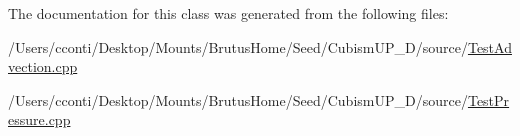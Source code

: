 The documentation for this class was generated from the following files\+:\begin{DoxyCompactItemize}
\item 
/\+Users/cconti/\+Desktop/\+Mounts/\+Brutus\+Home/\+Seed/\+Cubism\+U\+P\+\_\+D/source/\hyperlink{_test_advection_8cpp}{Test\+Advection.\+cpp}\item 
/\+Users/cconti/\+Desktop/\+Mounts/\+Brutus\+Home/\+Seed/\+Cubism\+U\+P\+\_\+D/source/\hyperlink{_test_pressure_8cpp}{Test\+Pressure.\+cpp}\end{DoxyCompactItemize}
